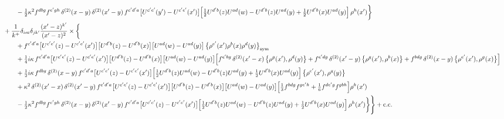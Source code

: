 \documentclass[10pt]{article}
\numberwithin{equation}{section}
\begin{document}
\begin{align}
&\qquad\quad-\tfrac12\kappa^{2}f^{dbg}f^{e^{\prime}gh}\,\delta^{(2)}(x-y)\,\delta^{(2)}(x^{\prime}-y)\,f^{c^{\prime}d^{\prime}a}\big[U^{c^{\prime}e^{\prime}}(y^{\prime})-U^{c^{\prime}e^{\prime}}(x^{\prime})\big]\Big[\tfrac12U^{d^{\prime}b}(z)U^{ad}(w)-U^{d^{\prime}b}(z)U^{ad}(y)+\tfrac12U^{d^{\prime}b}(x)U^{ad}(y)\Big]\,\rho^{h}(x^{\prime})\bigg\}\notag\\
&\quad+\frac{1}{k^{+}}\delta_{im}\delta_{jk^{\prime}}\frac{(x^{\prime}-z)^{k^{\prime}}}{(x^{\prime}-z)^{2}}\times\bigg\{\notag\\
&\qquad\quad+f^{c^{\prime}d^{\prime}a}\big[U^{c^{\prime}e^{\prime}}(z)-U^{c^{\prime}e^{\prime}}(x^{\prime})\big]\big[U^{d^{\prime}b}(z)-U^{d^{\prime}b}(x)\big]\big[U^{ad}(w)-U^{ad}(y)\big]\,\big\{\rho^{e^{\prime}}(x^{\prime})\rho^{b}(x)\rho^{d}(y)\big\}_{\rm sym}\notag\\
&\qquad\quad+\tfrac14 i\kappa\,f^{c^{\prime}d^{\prime}a}\big[U^{c^{\prime}e^{\prime}}(z)-U^{c^{\prime}e^{\prime}}(x^{\prime})\big]\big[U^{d^{\prime}b}(z)-U^{d^{\prime}b}(x)\big]\big[U^{ad}(w)-U^{ad}(y)\big]\Big[f^{e^{\prime}bg}\,\delta^{(2)}(x^{\prime}-x)\,\big\{\rho^{g}(x^{\prime}),\rho^{d}(y)\big\}+f^{e^{\prime}dg}\,\delta^{(2)}(x^{\prime}-y)\,\big\{\rho^{g}(x^{\prime}),\rho^{b}(x)\big\}+f^{bdg}\,\delta^{(2)}(x-y)\,\big\{\rho^{e^{\prime}}(x^{\prime}),\rho^{g}(x)\big\}\Big]\notag\\
&\qquad\quad+\tfrac12 i\kappa\,f^{dbg}\,\delta^{(2)}(x-y)\,f^{c^{\prime}d^{\prime}a}\big[U^{c^{\prime}e^{\prime}}(z)-U^{c^{\prime}e^{\prime}}(x^{\prime})\big]\Big[\tfrac12U^{d^{\prime}b}(z)U^{ad}(w)-U^{d^{\prime}b}(z)U^{ad}(y)+\tfrac12U^{d^{\prime}b}(x)U^{ad}(y)\Big]\,\big\{\rho^{e^{\prime}}(x^{\prime}),\rho^{g}(y)\big\}\notag\\
&\qquad\quad+\kappa^{2}\,\delta^{(2)}(x^{\prime}-x)\,\delta^{(2)}(x^{\prime}-y)\,f^{c^{\prime}d^{\prime}a}\big[U^{c^{\prime}e^{\prime}}(z)-U^{c^{\prime}e^{\prime}}(x^{\prime})\big]\big[U^{d^{\prime}b}(z)-U^{d^{\prime}b}(x)\big]\big[U^{ad}(w)-U^{ad}(y)\big]\Big[\tfrac13f^{bdg}f^{ge^{\prime}h}+\tfrac16f^{de^{\prime}g}f^{gbh}\Big]\rho^{h}(x^{\prime})\notag\\
&\qquad\quad-\tfrac12\kappa^{2}f^{dbg}f^{e^{\prime}gh}\,\delta^{(2)}(x-y)\,\delta^{(2)}(x^{\prime}-y)\,f^{c^{\prime}d^{\prime}a}\big[U^{c^{\prime}e^{\prime}}(z)-U^{c^{\prime}e^{\prime}}(x^{\prime})\big]\Big[\tfrac12U^{d^{\prime}b}(z)U^{ad}(w)-U^{d^{\prime}b}(z)U^{ad}(y)+\tfrac12U^{d^{\prime}b}(x)U^{ad}(y)\Big]\,\rho^{h}(x^{\prime})\bigg\}\Bigg\}+{\rm c.c.}
\end{align}
\newpage
\end{document}

